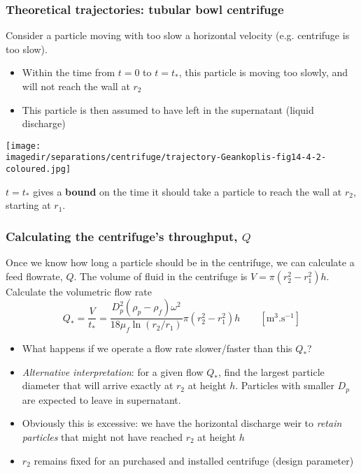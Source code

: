 \begin{frame}\frametitle{Theoretical trajectories: tubular bowl centrifuge}
	Consider a particle moving with too slow a horizontal velocity (e.g. centrifuge is too slow).
	\begin{itemize}
		\item	Within the time from $t=0$ to $t=t_*$, this particle is moving too slowly, and will not reach the wall at $r_2$ 
		\item	This particle is then assumed to have left in the supernatant (liquid discharge)
	\end{itemize}
	\begin{center}
		\texttt{[image: \\imagedir/separations/centrifuge/trajectory-Geankoplis-fig14-4-2-coloured.jpg]}
	\end{center}
	\vspace{-6pt}
	$t=t_*$ gives a \textbf{bound} on the time it should take a particle to reach the wall at $r_2$, starting at $r_1$.
\end{frame}

\begin{frame}\frametitle{Calculating the centrifuge's throughput, $Q$}
	Once we know how long a particle should be in the centrifuge, we can calculate a feed flowrate, $Q$.
	The volume of fluid in the centrifuge is $V = \pi \left(r_2^2 - r_1^2\right) h$. Calculate the volumetric flow rate
	\[
		Q_* = \frac{V}{t_*} = \frac{D_p^2\left(\rho_p - \rho_f\right)\omega^2}{18 \mu_f \ln (r_2/r_1)} \pi \left(r_2^2 - r_1^2\right) h \qquad[\text{m}^3.\text{s}^{-1}]
	\]
	\begin{itemize}
		\item	What happens if we operate a flow rate slower/faster than this $Q_*$?
		\item	\emph{Alternative interpretation}: for a given flow $Q_*$, find the largest particle diameter that will arrive exactly at $r_2$ at height $h$. Particles with smaller $D_p$ are expected to leave in supernatant.
		\item	Obviously this is excessive: we have the horizontal discharge weir to \emph{retain particles} that might not have reached $r_2$ at height $h$
		\item	$r_2$ remains fixed for an purchased and installed centrifuge (design parameter)
	\end{itemize}
\end{frame}

